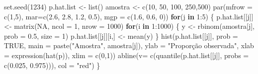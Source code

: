 \documentclass[
  10pt,
  a4paper]{book}
\newenvironment{Shaded}{\begin{snugshade}}{\end{snugshade}}
\newcommand{\AttributeTok}[1]{\textcolor[rgb]{0.77,0.63,0.00}{#1}}
\newcommand{\ConstantTok}[1]{\textcolor[rgb]{0.00,0.00,0.00}{#1}}
\newcommand{\ControlFlowTok}[1]{\textcolor[rgb]{0.13,0.29,0.53}{\textbf{#1}}}
\newcommand{\DecValTok}[1]{\textcolor[rgb]{0.00,0.00,0.81}{#1}}
\newcommand{\FloatTok}[1]{\textcolor[rgb]{0.00,0.00,0.81}{#1}}
\newcommand{\FunctionTok}[1]{\textcolor[rgb]{0.00,0.00,0.00}{#1}}
\newcommand{\NormalTok}[1]{#1}
\newcommand{\OtherTok}[1]{\textcolor[rgb]{0.56,0.35,0.01}{#1}}
\newcommand{\SpecialCharTok}[1]{\textcolor[rgb]{0.00,0.00,0.00}{#1}}
\newcommand{\StringTok}[1]{\textcolor[rgb]{0.31,0.60,0.02}{#1}}
\begin{document}
\begin{Shaded}
\begin{Highlighting}[]
\FunctionTok{set.seed}\NormalTok{(}\DecValTok{1234}\NormalTok{)}
\NormalTok{p.hat.list }\OtherTok{\textless{}{-}} \FunctionTok{list}\NormalTok{()}
\NormalTok{amostra }\OtherTok{\textless{}{-}} \FunctionTok{c}\NormalTok{(}\DecValTok{10}\NormalTok{, }\DecValTok{50}\NormalTok{, }\DecValTok{100}\NormalTok{, }\DecValTok{250}\NormalTok{,}\DecValTok{500}\NormalTok{)}
\FunctionTok{par}\NormalTok{(}\AttributeTok{mfrow =} \FunctionTok{c}\NormalTok{(}\DecValTok{1}\NormalTok{,}\DecValTok{5}\NormalTok{), }\AttributeTok{mar=}\FunctionTok{c}\NormalTok{(}\FloatTok{2.6}\NormalTok{, }\FloatTok{2.8}\NormalTok{, }\FloatTok{1.2}\NormalTok{, }\FloatTok{0.5}\NormalTok{), }\AttributeTok{mgp =} \FunctionTok{c}\NormalTok{(}\FloatTok{1.6}\NormalTok{, }\FloatTok{0.6}\NormalTok{, }\DecValTok{0}\NormalTok{))}
\ControlFlowTok{for}\NormalTok{(j }\ControlFlowTok{in} \DecValTok{1}\SpecialCharTok{:}\DecValTok{5}\NormalTok{) \{}
\NormalTok{  p.hat.list[[j]] }\OtherTok{\textless{}{-}} \FunctionTok{matrix}\NormalTok{(}\ConstantTok{NA}\NormalTok{, }\AttributeTok{ncol =} \DecValTok{1}\NormalTok{, }\AttributeTok{nrow =} \DecValTok{1000}\NormalTok{)}
  \ControlFlowTok{for}\NormalTok{(i }\ControlFlowTok{in} \DecValTok{1}\SpecialCharTok{:}\DecValTok{1000}\NormalTok{) \{}
\NormalTok{  y }\OtherTok{\textless{}{-}} \FunctionTok{rbinom}\NormalTok{(amostra[j], }\AttributeTok{prob =} \FloatTok{0.5}\NormalTok{, }\AttributeTok{size =} \DecValTok{1}\NormalTok{)}
\NormalTok{  p.hat.list[[j]][i,] }\OtherTok{\textless{}{-}} \FunctionTok{mean}\NormalTok{(y)}
\NormalTok{  \}}
\FunctionTok{hist}\NormalTok{(p.hat.list[[j]], }\AttributeTok{prob =} \ConstantTok{TRUE}\NormalTok{, }\AttributeTok{main =} \FunctionTok{paste}\NormalTok{(}\StringTok{"Amostra"}\NormalTok{, amostra[j]), }
     \AttributeTok{ylab =} \StringTok{"Proporção observada"}\NormalTok{,}
     \AttributeTok{xlab =} \FunctionTok{expression}\NormalTok{(}\FunctionTok{hat}\NormalTok{(p)), }\AttributeTok{xlim =} \FunctionTok{c}\NormalTok{(}\DecValTok{0}\NormalTok{,}\DecValTok{1}\NormalTok{))}
\FunctionTok{abline}\NormalTok{(}\AttributeTok{v=} \FunctionTok{c}\NormalTok{(}\FunctionTok{quantile}\NormalTok{(p.hat.list[[j]], }\AttributeTok{probs =} \FunctionTok{c}\NormalTok{(}\FloatTok{0.025}\NormalTok{, }\FloatTok{0.975}\NormalTok{))), }\AttributeTok{col =} \StringTok{"red"}\NormalTok{)}
\NormalTok{\}}
\end{Highlighting}
\end{Shaded}
\end{document}

